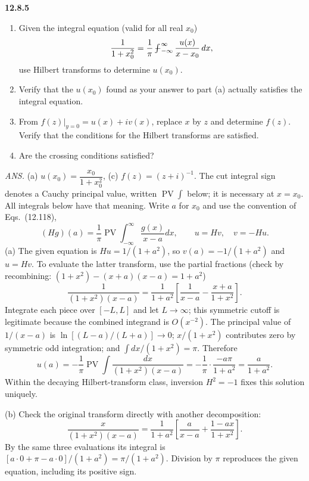 \par\bigskip
\noindent\textbf{12.8.5}\quad
\begin{enumerate}
\item[(a)] Given the integral equation (valid for all real $x_{0}$)
  \[
  \frac{1}{1+x_{0}^{2}}
  =\frac{1}{\pi}\PVint_{-\infty}^{\infty}\frac{u(x)}{x-x_{0}}\,dx,
  \]
  use Hilbert transforms to determine $u(x_{0})$.
\item[(b)] Verify that the $u(x_{0})$ found as your answer to part (a)
  actually satisfies the integral equation.
\item[(c)] From $f(z)|_{y=0}=u(x)+iv(x)$, replace $x$ by $z$ and determine
  $f(z)$. Verify that the conditions for the Hilbert transforms are
  satisfied.
\item[(d)] Are the crossing conditions satisfied?
\end{enumerate}
\par\nobreak\hfill\emph{ANS.}\enspace
(a) $u(x_{0})=\dfrac{x_{0}}{1+x_{0}^{2}}$,\quad
(c) $f(z)=(z+i)^{-1}$.
\solution
The cut integral sign denotes a Cauchy principal value, written
$\operatorname{PV}\int$ below; it is necessary at $x=x_0$. All integrals
below have that meaning. Write $a$ for $x_0$ and use the convention of
Eqs.~(12.118),
\[
(Hg)(a)=\frac1\pi\operatorname{PV}\int_{-\infty}^{\infty}
\frac{g(x)}{x-a}dx,\qquad u=Hv,\quad v=-Hu.
\]
(a) The given equation is $Hu=1/(1+a^2)$, so
$v(a)=-1/(1+a^2)$ and $u=Hv$. To evaluate the latter transform, use
the partial fractions (check by recombining: $(1+x^2)-(x+a)(x-a)=1+a^2$)
\[
\frac1{(1+x^2)(x-a)}
=\frac1{1+a^2}\left[\frac1{x-a}-\frac{x+a}{1+x^2}\right].
\]
Integrate each piece over $[-L,L]$ and let $L\to\infty$; this
symmetric cutoff is legitimate because the combined integrand is
$O(x^{-2})$. The principal value of $1/(x-a)$ is
$\ln[(L-a)/(L+a)]\to0$; $x/(1+x^2)$ contributes zero by symmetric odd
integration; and $\int dx/(1+x^2)=\pi$. Therefore
\[
u(a)=-\frac1\pi\operatorname{PV}\int
\frac{dx}{(1+x^2)(x-a)}
=-\frac1\pi\cdot\frac{-a\pi}{1+a^2}
=\boxed{\frac a{1+a^2}}.
\]
Within the decaying Hilbert-transform class, inversion $H^2=-1$
fixes this solution uniquely.

(b) Check the original transform directly with another decomposition:
\[
\frac{x}{(1+x^2)(x-a)}
=\frac1{1+a^2}\left[\frac a{x-a}+\frac{1-ax}{1+x^2}\right].
\]
By the same three evaluations its integral is
$[a\cdot0+\pi-a\cdot0]/(1+a^2)=\pi/(1+a^2)$. Division
by $\pi$ reproduces the given equation, including its positive sign.

